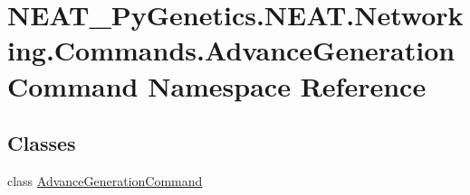 \hypertarget{namespaceNEAT__PyGenetics_1_1NEAT_1_1Networking_1_1Commands_1_1AdvanceGenerationCommand}{}\section{N\+E\+A\+T\+\_\+\+Py\+Genetics.\+N\+E\+A\+T.\+Networking.\+Commands.\+Advance\+Generation\+Command Namespace Reference}
\label{namespaceNEAT__PyGenetics_1_1NEAT_1_1Networking_1_1Commands_1_1AdvanceGenerationCommand}
\subsection*{Classes}
\begin{DoxyCompactItemize}
\item 
class \hyperlink{classNEAT__PyGenetics_1_1NEAT_1_1Networking_1_1Commands_1_1AdvanceGenerationCommand_1_1AdvanceGenerationCommand}{Advance\+Generation\+Command}
\end{DoxyCompactItemize}
